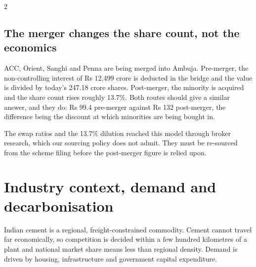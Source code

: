 \begin{paracol}{2}
\subsection{The merger changes the share count, not the economics}

ACC, Orient, Sanghi and Penna are being merged into Ambuja. Pre-merger, the
non-controlling interest of Rs 12,499 crore is deducted in the bridge and the value
is divided by today's 247.18 crore shares. Post-merger, the minority is acquired and
the share count rises roughly 13.7\%. Both routes should give a similar answer, and
they do: Rs 99.4 pre-merger against Rs 132 post-merger, the difference being the
discount at which minorities are being bought in.

\begin{notebox}
The swap ratios and the 13.7\% dilution reached this model through broker research,
which our sourcing policy does not admit. They must be re-sourced from the scheme
filing before the post-merger figure is relied upon.
\end{notebox}

\switchcolumn
{}



\switchcolumn*
\section{Industry context, demand and decarbonisation}

Indian cement is a regional, freight-constrained commodity. Cement cannot travel far
economically, so competition is decided within a few hundred kilometres of a plant and
national market share means less than regional density. Demand is driven by housing,
infrastructure and government capital expenditure.


\end{paracol}
